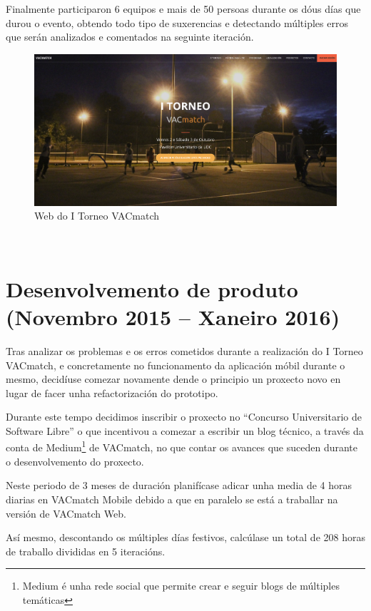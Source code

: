   Finalmente participaron 6 equipos e mais de 50 persoas durante os dóus días 
que durou o evento, obtendo todo tipo de suxerencias e detectando múltiples 
erros que serán analizados e comentados na seguinte iteración.

  \begin{figure}[h!]
        \begin{center}
        \includegraphics[width=\textwidth]{./img/torneo_vacmatch.png}
        \caption{Web do I Torneo VACmatch}
        \end{center}
  \end{figure}
\
  \section{Desenvolvemento de produto (Novembro 2015 -- Xaneiro 2016)}
  Tras analizar os problemas e os erros cometidos durante a realización do I 
Torneo VACmatch, e concretamente no funcionamento da aplicación móbil durante o 
mesmo, decidíuse comezar novamente dende o principio un proxecto novo en lugar 
de facer unha refactorización do prototipo.

    Durante este tempo decidimos inscribir o proxecto no ``Concurso 
Universitario de Software Libre'' o que incentivou a comezar a escribir un 
blog técnico, a través da conta de Medium\footnote{Medium é unha rede social 
que permite crear e seguir blogs de múltiples temáticas} de VACmatch, no que 
contar os avances que suceden durante o desenvolvemento do proxecto.

  Neste periodo de 3 meses de duración planifícase adicar unha media de 4 
horas diarias en VACmatch Mobile debido a que en paralelo se está a traballar 
na versión de VACmatch Web.

  Así mesmo, descontando os múltiples días festivos, calcúlase un total de 208 
horas de traballo divididas en 5 iteracións.


